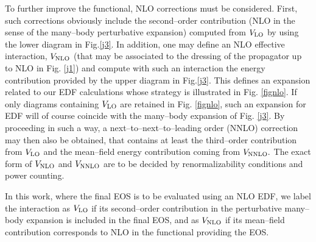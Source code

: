 \documentclass[aps,11pt,prc,preprint,superscriptaddress,nofootinbib]{revtex4}
\newcommand{\ora}[1]{\textcolor[rgb]{1.0,0.5,0.0}{\bf #1}}
\begin{document}
To further improve the functional, NLO corrections must be considered. First, such 
corrections obviously 
include the second--order contribution (NLO in the sense of the many--body perturbative expansion) computed from $V_{\rm LO}$ by using the lower diagram in Fig.\ref{j3}. In 
addition, one may define an NLO effective interaction, $V_{\rm NLO}$ (that may be associated to the 
dressing of the propagator up to NLO in Fig. \ref{j1})  
 and compute with such an interaction the energy contribution provided by the upper diagram in Fig.\ref{j3}.
This defines an expansion related to our EDF calculations whose strategy is illustrated in Fig. \ref{fignlo}. If only diagrams containing $V_{\rm LO}$ are retained in Fig. \ref{fignlo}, such an expansion for EDF will of course coincide with the many--body expansion of Fig. \ref{j3}.
By proceeding in such a way, a next--to--next--to--leading order (NNLO) correction 
may then also be obtained,  
that contains at least the third--order contribution from $V_{\rm LO}$ and the
mean--field energy contribution coming from $V_{\rm NNLO}.$ The exact form of $V_{\rm NLO}$
and $V_{\rm NNLO}$ are to be decided by renormalizability conditions and power
counting.  

In this work, where the final EOS is to be evaluated using an NLO EDF, we label the interaction as $V_{\rm LO}$ if its second--order contribution in the perturbative many--body expansion is included in the final EOS, and as $V_{\rm NLO}$ if its mean--field contribution corresponds to NLO in the functional providing the EOS. 
\end{document}
